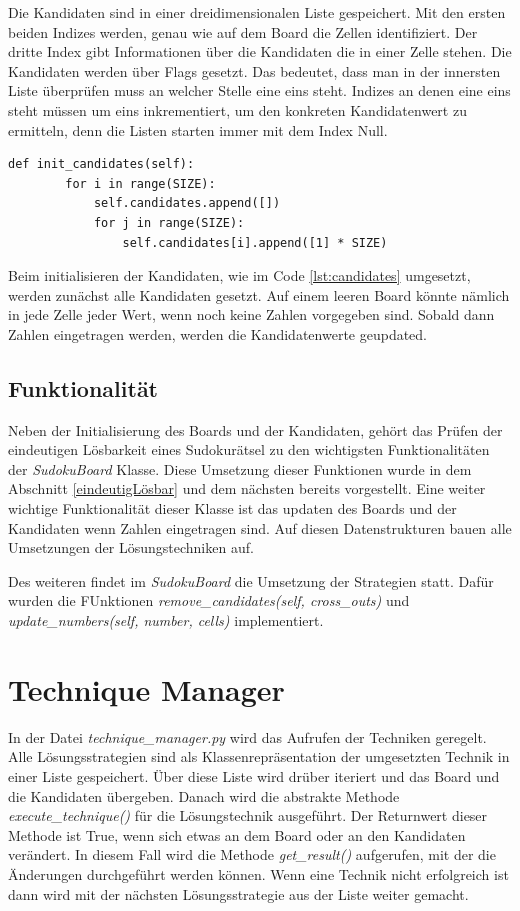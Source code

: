 Die Kandidaten sind in einer dreidimensionalen Liste gespeichert. Mit den ersten beiden Indizes werden, genau wie auf dem Board die Zellen identifiziert. Der dritte Index gibt Informationen über die Kandidaten die in einer Zelle stehen. Die Kandidaten werden über Flags gesetzt. Das bedeutet, dass man in der innersten Liste überprüfen muss an welcher Stelle eine eins steht. Indizes an denen eine eins steht müssen um eins inkrementiert, um den konkreten Kandidatenwert zu ermitteln, denn die Listen starten immer mit dem Index Null. 

\begin{lstlisting}[caption={Initalisierung der Kandidaten}, label={lst:candiates}]
	def init_candidates(self):
		for i in range(SIZE):
			self.candidates.append([])
			for j in range(SIZE):
				self.candidates[i].append([1] * SIZE)
\end{lstlisting}

Beim initialisieren der Kandidaten, wie im Code \ref{lst:candidates} umgesetzt, werden zunächst alle Kandidaten gesetzt. Auf einem leeren Board könnte nämlich in jede Zelle jeder Wert, wenn noch keine Zahlen vorgegeben sind. Sobald dann Zahlen eingetragen werden, werden die Kandidatenwerte geupdated.

\subsection{Funktionalität}
Neben der Initialisierung des Boards und der Kandidaten, gehört das Prüfen der eindeutigen Lösbarkeit eines Sudokurätsel zu den wichtigsten Funktionalitäten der \textit{SudokuBoard} Klasse. Diese Umsetzung dieser Funktionen wurde in dem Abschnitt \ref{eindeutigLösbar} und dem nächsten bereits vorgestellt. Eine weiter wichtige Funktionalität dieser Klasse ist das updaten des Boards und der Kandidaten wenn Zahlen eingetragen sind. Auf diesen Datenstrukturen bauen alle Umsetzungen der Lösungstechniken auf. 

Des weiteren findet im \textit{SudokuBoard} die Umsetzung der Strategien statt. Dafür wurden die FUnktionen \textit{remove\_candidates(self, cross\_outs)} und \textit{update\_numbers(self, number, cells)} implementiert. 




\section{Technique Manager}
In der Datei \textit{technique\_manager.py} wird das Aufrufen der Techniken geregelt. Alle Lösungsstrategien sind als Klassenrepräsentation der umgesetzten Technik in einer Liste gespeichert. Über diese Liste wird drüber iteriert und das Board und die Kandidaten übergeben. Danach wird die abstrakte Methode \textit{execute\_technique()} für die Lösungstechnik ausgeführt. Der Returnwert dieser Methode ist True, wenn sich etwas an dem Board oder an den Kandidaten verändert. In diesem Fall wird die Methode \textit{get\_result()} aufgerufen, mit der die Änderungen durchgeführt werden können.
Wenn eine Technik nicht erfolgreich ist dann wird mit der nächsten Lösungsstrategie aus der Liste weiter gemacht. 

